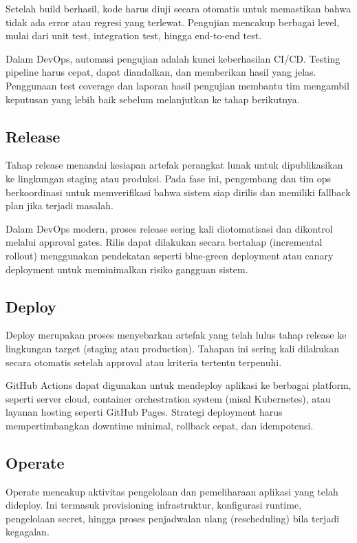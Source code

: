 Setelah build berhasil, kode harus diuji secara otomatis untuk memastikan bahwa tidak ada error atau regresi yang terlewat. Pengujian mencakup berbagai level, mulai dari unit test, integration test, hingga end-to-end test.

Dalam DevOps, automasi pengujian adalah kunci keberhasilan CI/CD. Testing pipeline harus cepat, dapat diandalkan, dan memberikan hasil yang jelas. Penggunaan test coverage dan laporan hasil pengujian membantu tim mengambil keputusan yang lebih baik sebelum melanjutkan ke tahap berikutnya.

\subsection{Release}

Tahap release menandai kesiapan artefak perangkat lunak untuk dipublikasikan ke lingkungan staging atau produksi. Pada fase ini, pengembang dan tim ops berkoordinasi untuk memverifikasi bahwa sistem siap dirilis dan memiliki fallback plan jika terjadi masalah.

Dalam DevOps modern, proses release sering kali diotomatisasi dan dikontrol melalui approval gates. Rilis dapat dilakukan secara bertahap (incremental rollout) menggunakan pendekatan seperti blue-green deployment atau canary deployment untuk meminimalkan risiko gangguan sistem.

\subsection{Deploy}

Deploy merupakan proses menyebarkan artefak yang telah lulus tahap release ke lingkungan target (staging atau production). Tahapan ini sering kali dilakukan secara otomatis setelah approval atau kriteria tertentu terpenuhi.

GitHub Actions dapat digunakan untuk mendeploy aplikasi ke berbagai platform, seperti server cloud, container orchestration system (misal Kubernetes), atau layanan hosting seperti GitHub Pages. Strategi deployment harus mempertimbangkan downtime minimal, rollback cepat, dan idempotensi.

\subsection{Operate}

Operate mencakup aktivitas pengelolaan dan pemeliharaan aplikasi yang telah dideploy. Ini termasuk provisioning infrastruktur, konfigurasi runtime, pengelolaan secret, hingga proses penjadwalan ulang (rescheduling) bila terjadi kegagalan.

